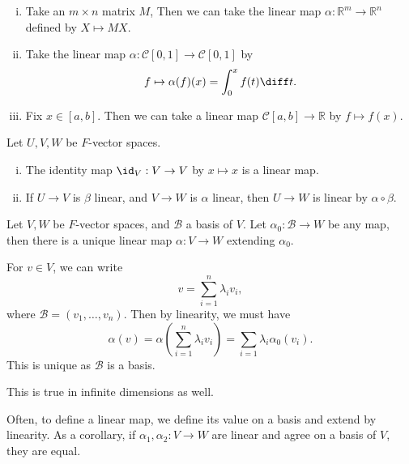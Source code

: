 \documentclass[12pt]{article}
\begin{document}
\begin{exbox}
	\begin{enumerate}[(i)]
		\item Take an $m \times n$ matrix $M$, Then we can take the linear map $\alpha : \mathbb{R}^{m} \to \mathbb{R}^{n}$ defined by $X \mapsto M X$.
		\item Take the linear map $\alpha : \mathcal{C}[0, 1] \to \mathcal{C}[0, 1]$ by
			\[
				f \mapsto \alpha(f)(x) = \int_{0}^{x}f(t)\diff t
			.\]
		\item Fix $x \in [a, b]$. Then we can take a linear map $\mathcal{C}[a, b] \to \mathbb{R}$ by $f \mapsto f(x)$.
	\end{enumerate}

\end{exbox}

\begin{remark}
	Let $U, V, W$ be $F$-vector spaces.
	\begin{enumerate}[(i)]
		\item The identity map $\id_V : V \to V$ by $x \mapsto x$ is a linear map.
		\item If $U \to V$ is $\beta$ linear, and $V \to W$ is $\alpha$ linear, then $U \to W$ is linear by $\alpha \circ \beta$.
	\end{enumerate}
\end{remark}

\begin{lemma}
	Let $V, W$ be $F$-vector spaces, and $\mathcal{B}$ a basis of $V$. Let $\alpha_0 : \mathcal{B} \to W$ be any map, then there is a unique linear map $\alpha : V \to W$ extending $\alpha_0$.
\end{lemma}

\begin{proofbox}
	For $v \in V$, we can write
\[
v = \sum_{i = 1}^{n} \lambda_i v_i
,\]
where $\mathcal{B} = (v_1, \ldots, v_n)$. Then by linearity, we must have
\[
	\alpha(v) = \alpha \left( \sum_{i = 1}^{n} \lambda_i v_i \right) = \sum_{i = 1}^{}\lambda_i \alpha_0 (v_i)
.\]
This is unique as $\mathcal{B}$ is a basis.
\end{proofbox}

\begin{remark}
	This is true in infinite dimensions as well.
\end{remark}

Often, to define a linear map, we define its value on a basis and extend by linearity. As a corollary, if $\alpha_1, \alpha_2 : V \to W$ are linear and agree on a basis of $V$, they are equal.
\end{document}
